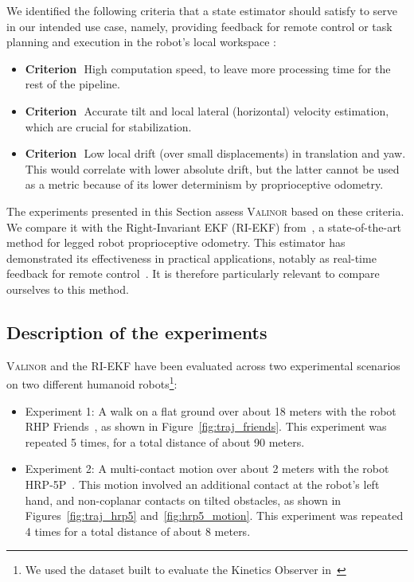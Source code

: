 \documentclass{IJCAS}
\newcommand{\critnum}[1]{\tikz[baseline=(char.base)]{
            \node[shape=circle,draw,inner sep=1pt](char){\textbf{#1}};}}
\begin{document}
We identified the following criteria that a state estimator should satisfy to serve in our intended use case, namely, providing feedback for remote control \cite{Grandia2024DesignControlBipedalRoboticCharacter} or task planning and execution in the robot's local workspace \cite{Tsuru2023OnlineMulticontactReplanningHumanoid}:
\begin{itemize}[label={}, leftmargin=1em]
  \item \textbf{Criterion}\,\critnum{1}\, High computation speed, to leave more processing time for the rest of the pipeline.
  \item \textbf{Criterion}\,\critnum{2}\, Accurate tilt and local lateral (horizontal) velocity estimation, which are crucial for stabilization.
  \item \textbf{Criterion}\,\critnum{3}\, Low local drift (over small displacements) in translation and yaw. This would correlate with lower absolute drift, but the latter cannot be used as a metric because of its lower determinism by proprioceptive odometry.
\end{itemize}

\noindent The experiments presented in this Section assess {\scshape Valinor} based on these criteria. We compare it with the Right-Invariant EKF (RI-EKF) from~\cite{Hartley2020RIEKF}, a state-of-the-art method for legged robot proprioceptive odometry. This estimator has demonstrated its effectiveness in practical applications, notably as real-time feedback for remote control~\cite{Grandia2024DesignControlBipedalRoboticCharacter}. It is therefore particularly relevant to compare ourselves to this method.

\subsection{Description of the experiments}

{\scshape Valinor} and the RI-EKF have been evaluated across two experimental scenarios on two different humanoid robots\footnote{We used the dataset built to evaluate the Kinetics Observer in~\cite{Demont2024KineticsObserver}}:
\begin{itemize}
    \item Experiment 1: A walk on a flat ground over about 18 meters with the robot RHP Friends~\cite{Benallegue2025RhpFriendsJRL}, as shown in Figure~\ref{fig:traj_friends}. This experiment was repeated 5 times, for a total distance of about 90 meters.
    \item Experiment 2: A multi-contact motion over about 2 meters with the robot HRP-5P~\cite{Kaneko2019Hrp5}. This motion involved an additional contact at the robot's left hand, and non-coplanar contacts on tilted obstacles, as shown in Figures~\ref{fig:traj_hrp5} and~\ref{fig:hrp5_motion}. This experiment was repeated 4 times for a total distance of about 8 meters.
\end{itemize}
\end{document}
